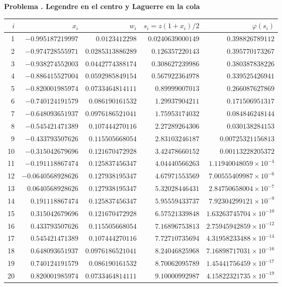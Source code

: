 \documentclass[11pt,a4paper]{article}
\theoremstyle{definition}
\newcounter{problema}
\newenvironment{resuelto}[1]{\refstepcounter{problema}\par\medskip\Needspace{6\baselineskip}\textbf{Problema \theproblema. #1}\par}{\par\medskip}
\begin{document}
\begin{resuelto}{Legendre en el centro y Laguerre en la cola}
\begin{center}\small\begin{tabular}{rrrrr}
\toprule
$i$&$x_i$&$w_i$&$s_i=z(1+x_i)/2$&$\varphi(s_i)$\\
\midrule
1&$-0.995187219997$&$0.0123412298$&$0.0240639000149$&$0.398826789112$\\
2&$-0.974728555971$&$0.0285313886289$&$0.126357220143$&$0.395770173267$\\
3&$-0.938274552003$&$0.0442774388174$&$0.308627239986$&$0.380387838226$\\
4&$-0.886415527004$&$0.0592985849154$&$0.567922364978$&$0.339525426941$\\
5&$-0.820001985974$&$0.0733464814111$&$0.89999007013$&$0.266087627869$\\
6&$-0.740124191579$&$0.086190161532$&$1.29937904211$&$0.171506951317$\\
7&$-0.648093651937$&$0.0976186521041$&$1.75953174032$&$0.084846248144$\\
8&$-0.545421471389$&$0.107444270116$&$2.27289264306$&$0.030138284153$\\
9&$-0.433793507626$&$0.115505668054$&$2.83103246187$&$0.00725321156813$\\
10&$-0.315042679696$&$0.121670472928$&$3.42478660152$&$0.00113228205372$\\
11&$-0.191118867474$&$0.125837456347$&$4.04440566263$&$1.11940048059\times10^{-4}$\\
12&$-0.0640568928626$&$0.127938195347$&$4.67971553569$&$7.00555409987\times10^{-6}$\\
13&$0.0640568928626$&$0.127938195347$&$5.32028446431$&$2.84750658004\times10^{-7}$\\
14&$0.191118867474$&$0.125837456347$&$5.95559433737$&$7.92304299121\times10^{-9}$\\
15&$0.315042679696$&$0.121670472928$&$6.57521339848$&$1.63263745704\times10^{-10}$\\
16&$0.433793507626$&$0.115505668054$&$7.16896753813$&$2.75945942859\times10^{-12}$\\
17&$0.545421471389$&$0.107444270116$&$7.72710735694$&$4.31958233488\times10^{-14}$\\
18&$0.648093651937$&$0.0976186521041$&$8.24046825968$&$7.16898717031\times10^{-16}$\\
19&$0.740124191579$&$0.086190161532$&$8.70062095789$&$1.45441756459\times10^{-17}$\\
20&$0.820001985974$&$0.0733464814111$&$9.10000992987$&$4.15822321735\times10^{-19}$\\

\end{tabular}
\end{center}
\end{resuelto}
\end{document}
